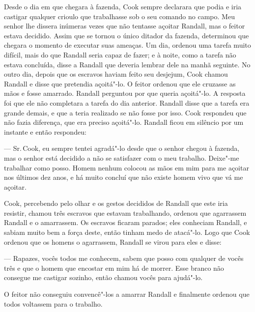 Desde o dia em que chegara à fazenda, Cook sempre declarara que podia e
iria castigar qualquer crioulo que trabalhasse sob o seu comando no
campo. Meu senhor lhe dissera inúmeras vezes que não tentasse açoitar
Randall, mas o feitor estava decidido. Assim que se tornou o único
ditador da fazenda, determinou que chegara o momento de executar suas
ameaças. Um dia, ordenou uma tarefa muito difícil, mais do que Randall
seria capaz de fazer; e à noite, como a tarefa não estava concluída,
disse a Randall que deveria lembrar dele na manhã seguinte. No outro
dia, depois que os escravos haviam feito seu desjejum, Cook chamou
Randall e disse que pretendia açoitá"-lo. O feitor ordenou que ele
cruzasse as mãos e fosse amarrado. Randall perguntou por que queria
açoitá"-lo. A resposta foi que ele não completara a tarefa do dia
anterior. Randall disse que a tarefa era grande demais, e que a teria
realizado se não fosse por isso. Cook respondeu que não fazia diferença,
que era preciso açoitá"-lo. Randall ficou em silêncio por um instante e
então respondeu:

--- Sr.\,Cook, eu sempre tentei agradá"-lo desde que o senhor chegou à
fazenda, mas o senhor está decidido a não se satisfazer com o meu
trabalho. Deixe"-me trabalhar como posso. Homem nenhum colocou as mãos em
mim para me açoitar nos últimos dez anos, e há muito concluí que não
existe homem vivo que vá me açoitar.

Cook, percebendo pelo olhar e os gestos decididos de Randall que este
iria resistir, chamou três escravos que estavam trabalhando, ordenou
que agarrassem Randall e o amarrassem. Os escravos ficaram parados; eles
conheciam Randall, e sabiam muito bem a força deste, então tinham medo
de atacá"-lo. Logo que Cook ordenou que os homens o agarrassem, Randall
se virou para eles e disse:

--- Rapazes, vocês todos me conhecem, sabem que posso com qualquer de
vocês três e que o homem que encostar em mim há de morrer. Esse branco
não consegue me castigar sozinho, então chamou vocês para ajudá"-lo.

O feitor não conseguiu convencê"-los a amarrar Randall e finalmente
ordenou que todos voltassem para o trabalho.

